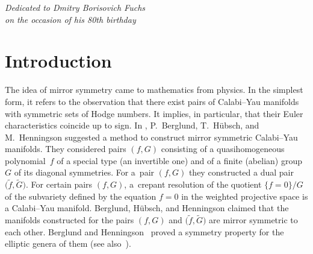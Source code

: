 \documentclass[pdftex]{sigma}
\numberwithin{equation}{section}
\begin{document}


\begin{flushright}
\begin{minipage}{65mm}
\it Dedicated to Dmitry Borisovich Fuchs\\
on the occasion of his 80th birthday
\end{minipage}
\end{flushright}

\renewcommand{\thefootnote}{\arabic{footnote}}
\setcounter{footnote}{0}

\section{Introduction} \label{sect:Intro}

The idea of mirror symmetry came to mathematics from physics. In the simplest form, it refers to
the observation that there exist pairs of Calabi--Yau manifolds with symmetric sets of Hodge numbers.
It implies, in particular, that their Euler characteristics coincide up to sign.
In \cite{BH2, BH1}, P.~Berglund, T.~H\"ubsch, and M.~Henningson suggested a method to construct mirror symmetric Calabi--Yau manifolds. They considered pairs $(f,G)$ consisting of a quasihomogeneous polynomial~$f$ of a special type (an invertible one) and of a finite (abelian) group $G$ of its diagonal symmetries. For a~pair $(f,G)$ they constructed a dual pair $\big(\widetilde{f}, \widetilde{G}\big)$. For certain pairs $(f,G)$, a~crepant resolution of the quotient $\{f =0 \}/G$ of the subvariety defined by the equation $f=0$ in the weighted projective space is a Calabi--Yau manifold. Berglund, H\"ubsch, and Henningson claimed that the manifolds constructed for the pairs $(f,G)$ and $\big(\widetilde{f}, \widetilde{G}\big)$ are mirror symmetric to each other. Berglund and Henningson~\cite{BH2} proved a symmetry property for the elliptic genera of them (see also~\cite{Kawai-Yang}).
\end{document}
